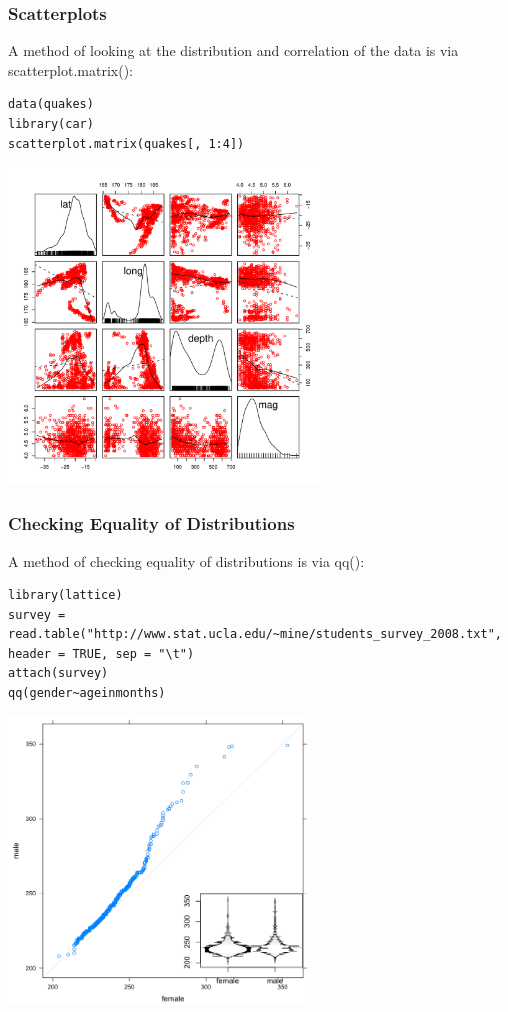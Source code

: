 \begin{frame}
\frametitle{Scatterplots}

A method of looking at the distribution and correlation of the data is via \ttfamily scatterplot.matrix(): \normalfont
  		\begin{lstlisting}
data(quakes)
library(car)		
scatterplot.matrix(quakes[, 1:4])
		\end{lstlisting}

        \begin{center}
         \includegraphics[width=0.63\textwidth]{images/scatterPlot.pdf}
        \end{center}
\end{frame}

\begin{frame}
\frametitle{Checking Equality of Distributions}

A method of checking equality of distributions is via \ttfamily qq(): \normalfont
  		\begin{lstlisting}
library(lattice)
survey = read.table("http://www.stat.ucla.edu/~mine/students_survey_2008.txt", header = TRUE, sep = "\t")
attach(survey) 
qq(gender~ageinmonths)
		\end{lstlisting}

        \begin{center}
         \includegraphics[width=0.6\textwidth]{images/qq.png}
        \end{center}
\end{frame}

